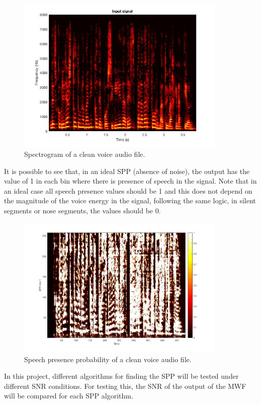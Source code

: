 \begin{figure}[!ht]
  \centering
	\includegraphics[width=100mm]{Kap2/spectro}
	\caption{Spectrogram of a clean voice audio file.}
	\label{fig:spectro}
\end{figure}

It is possible to see that, in an ideal SPP (absence of noise), the output has the value of 1 in each bin where there is presence of speech in the signal. Note that in an ideal case all speech presence values should be 1 and this does not depend on the magnitude of the voice energy in the signal, following the same logic, in silent segments or nose segments, the values should be 0. 

\begin{figure}[!ht]
  \centering
	\includegraphics[width=100mm]{Kap2/SPP}
	\caption{Speech presence probability of a clean voice audio file.}
	\label{fig:SPP}
\end{figure}

In this project, different algorithms for finding the SPP will be tested under different SNR conditions. For testing this, the SNR of the output of the MWF will be compared for each SPP algorithm.

